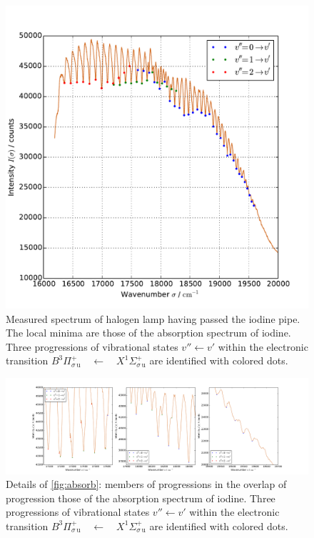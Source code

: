 \begin{figure}
\centering
\includegraphics[width=\pltw]{analysis/figures/absorp_03.pdf}
\caption{Measured spectrum of halogen lamp having passed the iodine pipe. The local minima are 
those of the absorption spectrum of iodine. Three progressions of vibrational states $v'' \leftarrow v'$
within the electronic transition 
$B ^3\Pi_{\sigma \, \mathrm{u}}^{+} \quad \leftarrow \quad X ^1\Sigma_{\sigma \, \mathrm{u}}^{+}$ 
are identified with colored dots. }
\label{fig:absorp}
\end{figure}

\begin{figure}
\centering
\includegraphics[width=\pltw]{analysis/figures/absorp_03_detail_01.pdf}
\caption{Details of \ref{fig:absorb}: members of progressions in the overlap of progression 
those of the absorption spectrum of iodine. Three progressions of vibrational states $v'' \leftarrow v'$
within the electronic transition 
$B ^3\Pi_{\sigma \, \mathrm{u}}^{+} \quad \leftarrow \quad X ^1\Sigma_{\sigma \, \mathrm{u}}^{+}$ 
are identified with colored dots. }
\label{fig:absorp_detail}
\end{figure}


